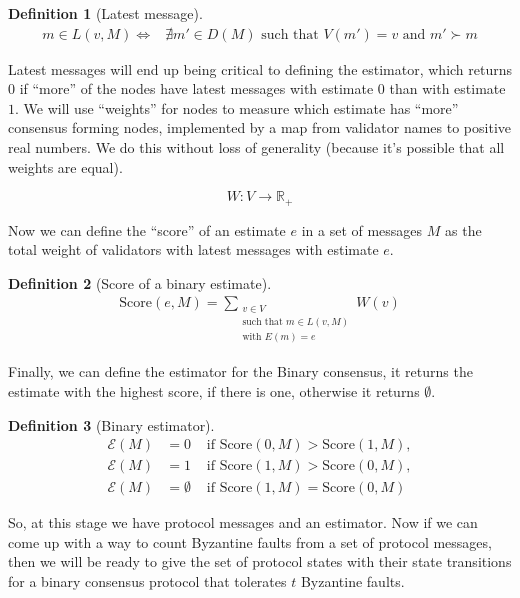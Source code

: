 \documentclass{article}
\theoremstyle{definition}
\newtheorem{defn}{Definition}[section]
\begin{document}
\begin{defn}[Latest message]
\begin{equation*}
\begin{split}
m \in L(v, M) \iff & \nexists m' \in D(M) \text{ such that } V(m') = v \text{ and } m' \succ m
\end{split}
\end{equation*}
\end{defn}

Latest messages will end up being critical to defining the estimator, which returns $0$ if ``more'' of the nodes have latest messages with estimate $0$ than with estimate $1$. We will use ``weights'' for nodes to measure which estimate has ``more'' consensus forming nodes, implemented by a map from validator names to positive real numbers. We do this without loss of generality (because it's possible that all weights are equal).

$$
W:V \to \mathbb{R}_+
$$


Now we can define the ``score'' of an estimate $e$ in a set of messages $M$ as the total weight of validators with latest messages with estimate $e$.

\begin{defn}[Score of a binary estimate]
\begin{align}
\text{Score}(e, M) = \sum_{\substack{v \in V \\ \text{such that } m \in L(v,M) \\ \text{with } E(m) = e}} W(v)
\end{align}
\end{defn}

Finally, we can define the estimator for the Binary consensus, it returns the estimate with the highest score, if there is one, otherwise it returns $\emptyset$.

\begin{defn}[Binary estimator]
\begin{align}
  \mathcal{E}(M) &= 0 &\text{ if } \text{Score}(0, M) > \text{Score}(1, M), \\
  \mathcal{E}(M) &= 1 &\text{ if } \text{Score}(1, M) > \text{Score}(0, M), \\
  \mathcal{E}(M) &= \emptyset &\text{ if } \text{Score}(1, M) = \text{Score}(0, M)
\end{align}
\end{defn}

So, at this stage we have protocol messages and an estimator. Now if we can come up with a way to count Byzantine faults from a set of protocol messages, then we will be ready to give the set of protocol states with their state transitions for a binary consensus protocol that tolerates $t$ Byzantine faults.
\end{document}
